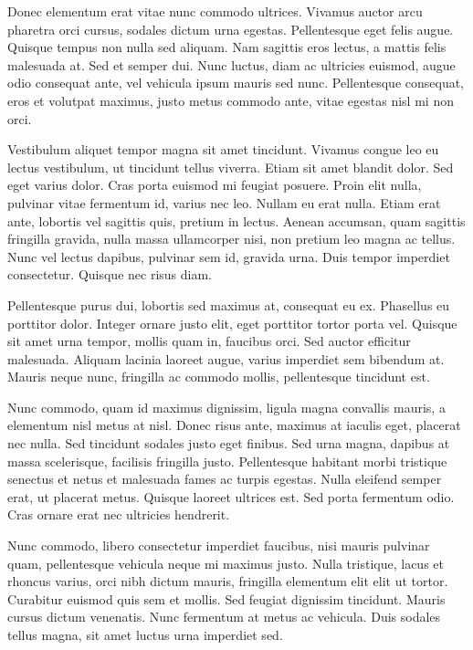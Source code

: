 Donec elementum erat vitae nunc commodo ultrices. Vivamus auctor arcu pharetra orci cursus, sodales dictum urna egestas. Pellentesque eget felis augue. Quisque tempus non nulla sed aliquam. Nam sagittis eros lectus, a mattis felis malesuada at. Sed et semper dui. Nunc luctus, diam ac ultricies euismod, augue odio consequat ante, vel vehicula ipsum mauris sed nunc. Pellentesque consequat, eros et volutpat maximus, justo metus commodo ante, vitae egestas nisl mi non orci.

Vestibulum aliquet tempor magna sit amet tincidunt. Vivamus congue leo eu lectus vestibulum, ut tincidunt tellus viverra. Etiam sit amet blandit dolor. Sed eget varius dolor. Cras porta euismod mi feugiat posuere. Proin elit nulla, pulvinar vitae fermentum id, varius nec leo. Nullam eu erat nulla. Etiam erat ante, lobortis vel sagittis quis, pretium in lectus. Aenean accumsan, quam sagittis fringilla gravida, nulla massa ullamcorper nisi, non pretium leo magna ac tellus. Nunc vel lectus dapibus, pulvinar sem id, gravida urna. Duis tempor imperdiet consectetur. Quisque nec risus diam.

Pellentesque purus dui, lobortis sed maximus at, consequat eu ex. Phasellus eu porttitor dolor. Integer ornare justo elit, eget porttitor tortor porta vel. Quisque sit amet urna tempor, mollis quam in, faucibus orci. Sed auctor efficitur malesuada. Aliquam lacinia laoreet augue, varius imperdiet sem bibendum at. Mauris neque nunc, fringilla ac commodo mollis, pellentesque tincidunt est.

Nunc commodo, quam id maximus dignissim, ligula magna convallis mauris, a elementum nisl metus at nisl. Donec risus ante, maximus at iaculis eget, placerat nec nulla. Sed tincidunt sodales justo eget finibus. Sed urna magna, dapibus at massa scelerisque, facilisis fringilla justo. Pellentesque habitant morbi tristique senectus et netus et malesuada fames ac turpis egestas. Nulla eleifend semper erat, ut placerat metus. Quisque laoreet ultrices est. Sed porta fermentum odio. Cras ornare erat nec ultricies hendrerit.

Nunc commodo, libero consectetur imperdiet faucibus, nisi mauris pulvinar quam, pellentesque vehicula neque mi maximus justo. Nulla tristique, lacus et rhoncus varius, orci nibh dictum mauris, fringilla elementum elit elit ut tortor. Curabitur euismod quis sem et mollis. Sed feugiat dignissim tincidunt. Mauris cursus dictum venenatis. Nunc fermentum at metus ac vehicula. Duis sodales tellus magna, sit amet luctus urna imperdiet sed.

